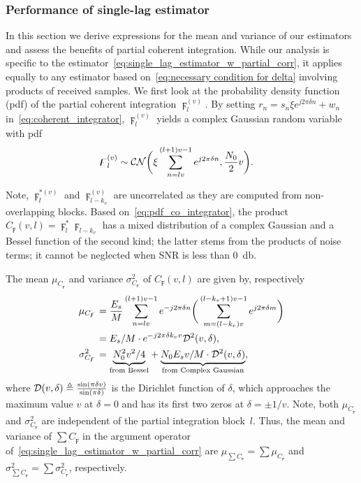 \subsubsection{Performance of single-lag estimator}

In this section we derive expressions for the mean and variance of our
estimators and assess the benefits of partial coherent integration.
While our analysis is specific to the
estimator~\eqref{eq:single_lag_estimator_w_partial_corr}, it
applies equally to any estimator based on~\eqref{eq:necessary
  condition for delta} involving products of received samples.
We first look at
the probability density function (pdf) of the partial coherent integration
$\digamma_l^{(v)}$.
By setting $r_n=s_n\xi e^{j2\pi \delta n}+w_n$ in~\eqref{eq:coherent_integrator},
$\digamma_{l}^{(v)}$ yields a complex Gaussian random variable with pdf
\begin{equation}
  \label{eq:pdf_co_integrator}
  \begin{aligned}
    &\digamma_l^{(v)} \sim \mathcal{CN}\bigg(\xi\sum_{n=lv}^{(l+1)v-1}e^{j2\pi \delta n},\frac{N_0}{2}v\bigg).
  \end{aligned}
\end{equation}

Note, $\digamma_l^{*(v)}$ and $\digamma_{l-k_v}^{(v)}$ are
uncorrelated as they are computed from non-overlapping blocks. 
Based on~\eqref{eq:pdf_co_integrator}, 
the product $C_{\digamma}(v,l)=\digamma_l^*\digamma_{l-k_v}$
has a mixed distribution of a complex Gaussian and a Bessel function
of the second kind; 
the latter stems from the products of noise terms; it cannot be
neglected when SNR is less than \SI{0}{\decibel}. 

The mean $\mu_{C_{\digamma}}$ and variance $\sigma^2_{C_{\digamma}}$ of $C_{\digamma}(v,l)$ are given by, respectively 
\begin{equation}
  \begin{aligned}
  \label{eq:mean_var_product_coherent_int}
  \mu_{C_{\digamma}}&=\frac{E_s}{M}\sum_{n=lv}^{(l+1)v-1}e^{-j2\pi \delta n}\bigg(\sum_{m=(l-k_v)v}^{(l-k_v+1)v-1}e^{j2\pi \delta m}\bigg) \\
  &=E_s/M\cdot e^{-j2\pi \delta k_vv}\mathcal{D}^2(v,\delta), \\
  \sigma^2_{C_{\digamma}}&={\underbrace{N_0^2v^2/4}_{\text{from Bessel}}}+{\underbrace{N_0E_sv/M\cdot\mathcal{D}^2(v,\delta)}_{\text{from Complex Gaussian}}},
  \end{aligned}
\end{equation}
where $\mathcal{D}(v,\delta) \triangleq \frac{\sin(\pi \delta v)}{\sin(\pi
  \delta)}$ is the Dirichlet function of $\delta$, which approaches 
the maximum value $v$ at $\delta=0$ and has its first two zeros at $\delta=\pm 1/v$.
Note, both $\mu_{C_{\digamma}}$ and $\sigma^2_{C_{\digamma}}$ are independent of the partial integration block~$l$.
Thus, the mean and variance of  
$\sum C_{\digamma}$ in the argument operator of~\eqref{eq:single_lag_estimator_w_partial_corr} 
are $\mu_{\sum C_{\digamma}}=\sum\mu_{C_{\digamma}}$ and 
$\sigma^2_{\sum C_{\digamma}}=\sum\sigma^2_{C_{\digamma}}$, respectively.

